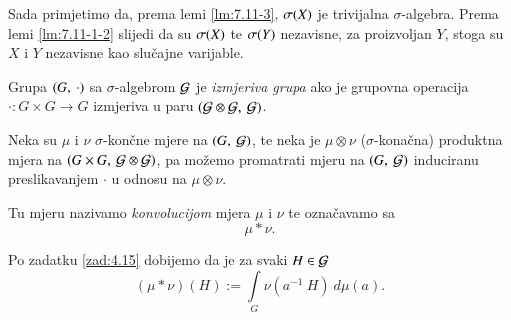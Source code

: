 \begin{rj}[\ref{zad:7.11}]
    Sada primjetimo da, prema lemi \ref{lm:7.11-3}, $\sigma({X})$ je trivijalna $\sigma$-algebra.
    Prema lemi \ref{lm:7.11-1-2} slijedi da su $\sigma({X})$ te $\sigma({Y})$ nezavisne,
    za proizvoljan $Y$, stoga su $X$ i $Y$ nezavisne kao slu\v cajne varijable.
\end{rj}

\begin{defn}    \label{defn:7.11-1}
    Grupa $({G}, \: {\cdot})$ sa $\sigma$-algebrom $\mathcal{G}$ je \emph{izmjeriva grupa} ako je grupovna operacija $\cdot : G \times G \to G$ izmjeriva u paru $({\mathcal{G} \otimes \mathcal{G}}, \: {\mathcal{G}})$.
\end{defn}

\begin{defn}    \label{defn:7.11-2}
    Neka su $\mu$ i $\nu$ $\sigma$-kon\v cne mjere na $({G}, \: {\mathcal{G}})$, te neka je $\mu \otimes \nu$ ($\sigma$-kona\v cna) produktna mjera na $({G \times G}, \: {\mathcal{G} \otimes \mathcal{G}})$, pa mo\v zemo promatrati mjeru na $({G}, \: {\mathcal{G}})$ induciranu preslikavanjem $\cdot$ u odnosu na $\mu \otimes \nu$.
    
    Tu mjeru nazivamo \emph{konvolucijom} mjera $\mu$ i $\nu$ te ozna\v cavamo sa
    \begin{equation*}
        \mu * \nu.
    \end{equation*}
\end{defn}

Po zadatku \ref{zad:4.15} dobijemo da je za svaki $H \in \mathcal{G}$
\begin{equation*}   \label{jed:7.12}
    (\mu * \nu)(H) := \int\limits_G \nu (a^{-1} \: H) \: d \mu (a).
\end{equation*}

